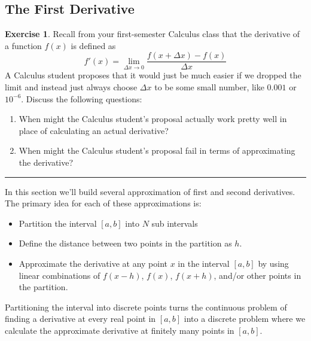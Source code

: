\documentclass[
]{book}
\providecommand{\tightlist}{%
  \setlength{\itemsep}{0pt}\setlength{\parskip}{0pt}}
\theoremstyle{definition}
\theoremstyle{definition}
\theoremstyle{definition}
\newtheorem{exercise}{Exercise}[chapter]
\theoremstyle{remark}
\begin{document}
\hypertarget{the-first-derivative}{%
\subsection{The First Derivative}\label{the-first-derivative}}

\begin{exercise}
\protect\hypertarget{exr:unnamed-chunk-137}{}{\label{exr:unnamed-chunk-137} }Recall from your first-semester Calculus class that the derivative of a
function \(f(x)\) is defined as
\[f'(x) = \lim_{\Delta x \to 0} \frac{f(x+\Delta x) - f(x)}{\Delta x}\]
A Calculus student proposes that it would just be much easier if we
dropped the limit and instead just always choose \(\Delta x\) to be some
small number, like \(0.001\) or \(10^{-6}\). Discuss the following questions:

\begin{enumerate}
\def\labelenumi{\alph{enumi}.}
\item
  When might the Calculus student's proposal actually work pretty well
  in place of calculating an actual derivative?
\item
  When might the Calculus student's proposal fail in terms of approximating the derivative?
\end{enumerate}
\end{exercise}

\begin{center}\rule{0.5\linewidth}{0.5pt}\end{center}

In this section we'll build several approximation of first and second
derivatives. The primary idea for each of these approximations is:

\begin{itemize}
\tightlist
\item
  Partition the interval \([a,b]\) into \(N\) sub intervals
\item
  Define the distance between two points in the partition as \(h\).\\
\item
  Approximate the derivative at any point \(x\) in the interval \([a,b]\) by using linear combinations of \(f(x-h)\), \(f(x)\), \(f(x+h)\), and/or other points in the partition.
\end{itemize}

Partitioning the interval into discrete points turns the continuous
problem of finding a derivative at every real point in \([a,b]\) into a
discrete problem where we calculate the approximate derivative at
finitely many points in \([a,b]\).
\end{document}
